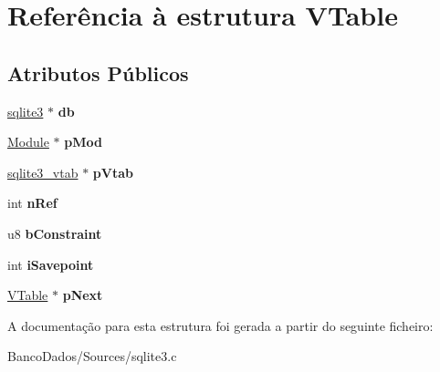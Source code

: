 \hypertarget{struct_v_table}{\section{Referência à estrutura V\-Table}
\label{struct_v_table}
}
\subsection*{Atributos Públicos}
\begin{DoxyCompactItemize}
\item 
\hypertarget{struct_v_table_a855b43c118d693910e9060cc9d9ac91a}{\hyperlink{structsqlite3}{sqlite3} $\ast$ {\bfseries db}}\label{struct_v_table_a855b43c118d693910e9060cc9d9ac91a}

\item 
\hypertarget{struct_v_table_ae444452a7168e2f4224a75768abe8312}{\hyperlink{struct_module}{Module} $\ast$ {\bfseries p\-Mod}}\label{struct_v_table_ae444452a7168e2f4224a75768abe8312}

\item 
\hypertarget{struct_v_table_ae15b9cb002c013019dcbac919bda9ac8}{\hyperlink{structsqlite3__vtab}{sqlite3\-\_\-vtab} $\ast$ {\bfseries p\-Vtab}}\label{struct_v_table_ae15b9cb002c013019dcbac919bda9ac8}

\item 
\hypertarget{struct_v_table_a12ffe156e5e8e7d19ed029ccfe4ab5dc}{int {\bfseries n\-Ref}}\label{struct_v_table_a12ffe156e5e8e7d19ed029ccfe4ab5dc}

\item 
\hypertarget{struct_v_table_a5a970416a76dbe3be500c9458c89550d}{u8 {\bfseries b\-Constraint}}\label{struct_v_table_a5a970416a76dbe3be500c9458c89550d}

\item 
\hypertarget{struct_v_table_a19f1c6c5f5fedabba7e605bbe15358e4}{int {\bfseries i\-Savepoint}}\label{struct_v_table_a19f1c6c5f5fedabba7e605bbe15358e4}

\item 
\hypertarget{struct_v_table_af3cac5e5a38508d0111acb9aa6c5f435}{\hyperlink{struct_v_table}{V\-Table} $\ast$ {\bfseries p\-Next}}\label{struct_v_table_af3cac5e5a38508d0111acb9aa6c5f435}

\end{DoxyCompactItemize}


A documentação para esta estrutura foi gerada a partir do seguinte ficheiro\-:\begin{DoxyCompactItemize}
\item 
Banco\-Dados/\-Sources/sqlite3.\-c\end{DoxyCompactItemize}
